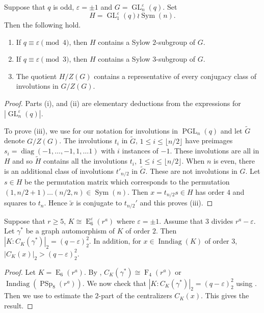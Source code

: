 \documentclass[12pt,a4paper]{amsart}
\newcommand{\wt}{\widetilde}
\DeclareMathOperator{\Inndiag}{Inndiag}
\DeclareMathOperator{\E}{E}
\DeclareMathOperator{\F}{F}
\DeclareMathOperator{\GL}{GL}
\DeclareMathOperator{\PGL}{PGL}
\DeclareMathOperator{\PSp}{PSp}
\DeclareMathOperator{\diag}{diag}
\DeclareMathOperator{\Sym}{Sym}
\renewcommand{\epsilon}{\varepsilon}
\newcommand{\eps}{\epsilon}
\begin{document}
\begin{proposition}\label{GLfact} Suppose that $q$ is odd, $\eps=\pm 1$  and $G= \GL_n^\epsilon(q)$. Set $$H= \GL_1^\epsilon(q) \wr \Sym(n).$$  Then the following hold.
\begin{enumerate}
\item If $q\equiv \epsilon \pmod 4$, then $H$ contains a Sylow $2$-subgroup of $G$.
\item If $q\equiv \epsilon \pmod 3$, then $H$ contains a Sylow $3$-subgroup of $G$.
\item The quotient $H/Z(G)$ contains a representative of every conjugacy class of involutions in $G/Z(G)$.
\end{enumerate}


\end{proposition}
\begin{proof} Parts (i), and (ii)  are elementary deductions from the   expressions for $|\GL_n^\eps(q)|$.



To prove (iii),  we use \cite[Table 4.5.1]{GLS3} for our notation for involutions in $\PGL_n(q)$ and let $\wt G$ denote $G/Z(G)$.  The involutions $t_i$ in $\wt G$, $1\le i \le \lfloor n/2\rfloor  $ have preimages  $s_i=\diag(-1,\dots,-1,1,\dots 1)$ with $i$ instances of $-1$. These involutions are all in $H$ and so $\wt H$ contains all the involutions $t_i$, $1 \le i \le \lfloor n/2\rfloor$.
When $n$ is even, there is an additional class of involutions  $t'_{n/2}$ in $\wt G$. These are not involutions in $G$.
Let $s\in H$ be the permutation matrix which corresponds to the permutation $(1,n/2+1) \dots (n/2,n)\in \Sym(n)$.
  Then $x=   t_{n/2}s\in H$ has order $4$ and squares to $t_n$. Hence $\wt x$  is conjugate to $t_{n/2}'$ and this proves (iii).
\end{proof}

\begin{lemma}\label{lem:E6 big 2-part} Suppose that $r \ge 5$, $K \cong \E_6^\eps(r^a)$ where $\eps=\pm 1$. Assume that $3$ divides $r^a-\eps$. Let $\gamma^*$ be a graph automorphism of  $K$ of order $2$. Then $|K:C_K(\gamma^*)|_2= (q-\eps)^2_2$.  In addition, for
 $x\in \Inndiag(K)$ of order $3$, $|C_K(x)|_2> (q-\eps)^2_2$.
\end{lemma}

\begin{proof} Let $K=\E_6(r^a)$. By \cite[Table 4.5.1]{GLS3}, $C_K(\gamma^*) \cong \F_4(r^a)$ or $\Inndiag(\PSp_8(r^a))$. We now check that $|K:C_K(\gamma^*)|_2= (q-\eps)^2_2$ using \cite[Table 2.2]{GLS3}. Then we  use \cite[Table 4.7.3A]{GLS3} to estimate the $2$-part of the centralizers $C_K(x)$. This gives the result.
\end{proof}
\end{document}
